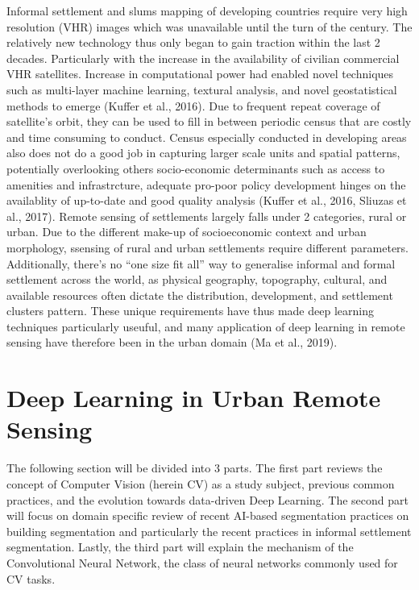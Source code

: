 \documentclass[11pt, a4paper, twoside]{report}
\begin{document}
Informal settlement and slums mapping of developing countries require very high resolution (VHR) images which was unavailable until the turn of the century. The relatively new technology thus only began to gain traction within the last 2 decades. Particularly with the increase in the availability of civilian commercial VHR satellites. Increase in computational power had enabled novel techniques such as multi-layer machine learning, textural analysis, and novel geostatistical methods to emerge (Kuffer et al., 2016). Due to frequent repeat coverage of satellite’s orbit, they can be used to fill in between periodic census that are costly and time consuming to conduct. Census especially conducted in developing areas also does not do a good job in capturing larger scale units and spatial patterns, potentially overlooking others socio-economic determinants such as access to amenities and infrastrcture, adequate pro-poor policy development hinges on the availablity of up-to-date and good quality analysis (Kuffer et al., 2016, Sliuzas et al., 2017). Remote sensing of settlements largely falls under 2 categories, rural or urban. Due to the different make-up of socioeconomic context and urban morphology, ssensing of rural and urban settlements require different parameters. Additionally, there’s no “one size fit all” way to generalise informal and formal settlement across the world, as physical geography, topography, cultural, and available resources often dictate the distribution, development, and settlement clusters pattern. These unique requirements have thus made deep learning techniques particularly useuful, and many application of deep learning in remote sensing have therefore been in the urban domain (Ma et al., 2019).

\section{Deep Learning in Urban Remote Sensing}\label{DLinRS}

The following section will be divided into 3 parts. The first part reviews the concept of Computer Vision (herein CV) as a study subject, previous common practices, and the evolution towards data-driven Deep Learning. The second part will focus on domain specific review of recent AI-based segmentation practices on building segmentation and particularly the recent practices in informal settlement segmentation. Lastly, the third part will explain the mechanism of the Convolutional Neural Network, the class of neural networks commonly used for CV tasks.
\end{document}
